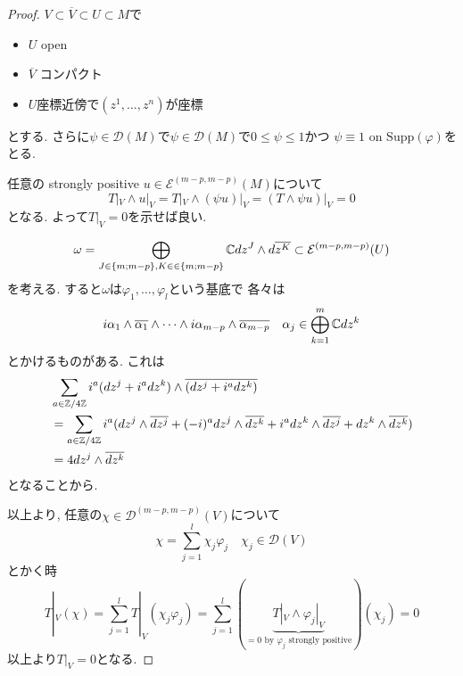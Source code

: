 \begin{proof}
$V \subset \overline{V} \subset U \subset M$で
\begin{itemize}
\item $U$ open
\item $\overline{V}$ コンパクト
\item $U$座標近傍で$(z^1, \ldots, z^n)$が座標
\end{itemize}
とする.
さらに$\psi \in \mathcal{D}(M)$で$\psi \in {\mathcal{D}}(M)$で$0 \le \psi \le 1$かつ $\psi \equiv 1$ on $\mathrm{Supp}(\varphi)$をとる. 

任意の strongly positive $u \in {\mathcal{E}}^{(m-p,m-p)}(M)$について
$$
T|_{V} \wedge u|_{V}
=T|_{V} \wedge (\psi u)|_{V}
=(T \wedge \psi u)|_{V}
=0
$$
となる. 
よって$T|_{V}=0$を示せば良い. 

$$
\omega = \bigoplus_{J \in \{m ; m-p \}, K \in \in \{m;m-p \}}
\mathbb{C} dz^J \wedge d \overline{z^K}
\subset  {\mathcal{E}}^{(m-p,m-p)}(U)
$$
を考える. 
すると$\omega$は$\varphi_1, \ldots, \varphi_l$という基底で
各々は
$$
i\alpha_1\wedge\overline{\alpha_1}\wedge\cdots\wedge
i\alpha_{m-p}\wedge\overline{\alpha_{m-p}}
\quad 
\alpha_j \in \bigoplus_{k=1}^{m} \mathbb{C} dz^k
$$
とかけるものがある. 
これは
\begin{align*}
&\sum_{a \in \mathbb{Z}/4\mathbb{Z}}
i^a (dz^j + i^a dz^k) \wedge \overline{ (dz^j + i^a dz^k)}
\\
&=\sum_{a \in \mathbb{Z}/4\mathbb{Z}}
i^a (dz^j \wedge \overline{dz^j} + (-i)^a dz^j \wedge \overline{dz^k} 
+ i^a dz^k \wedge \overline{dz^j} + dz^k \wedge \overline{dz^k})
\\
&=4 dz^j \wedge \overline{dz^k}
\end{align*}
となることから. 

以上より, 任意の$\chi \in \mathcal{D}^{(m-p, m-p)}(V)$について
$$
\chi = \sum_{j=1}^{l} \chi_j \varphi_j
\quad \chi_j \in \mathcal{D}(V)
$$
とかく時
$$
T|_{V}(\chi)
=\sum_{j=1}^{l}
T|_{V}(\chi_j \varphi_j)
=\sum_{j=1}^{l}
(\underbrace{T|_{V} \wedge \varphi_j |_{V}}_{=0 \text{ by $\varphi_j$ strongly positive}})
(\chi_j )
=0
$$
以上より$T|_{V}=0$となる. 
\end{proof}

